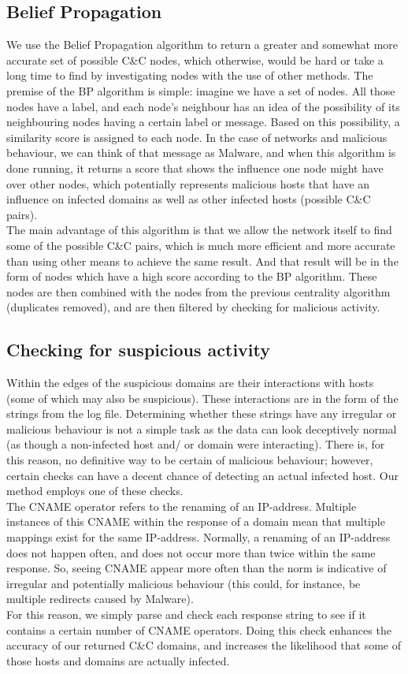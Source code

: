 \documentclass{article} %
\begin{document}
\subsection{Belief Propagation}
We use the Belief Propagation algorithm to return a greater and somewhat more accurate set of possible C\&C nodes, which otherwise, would be hard or take a long time to find by investigating nodes with the use of other methods. 
The premise of the BP algorithm is simple: imagine we have a set of nodes. All those nodes have a label, and each node's neighbour has an idea of the possibility of its neighbouring nodes having a certain label or message. Based on this 
possibility, a similarity score is assigned to each node. In the case of networks and malicious behaviour, we can think of that message as Malware, and when this algorithm is done running, it returns a score that shows the influence one 
node might have over other nodes, which potentially represents malicious hosts that have an influence on infected domains as well as other infected hosts (possible C\&C pairs). \\
The main advantage of this algorithm is that we allow the network itself to find some of the possible C\&C pairs, which is much more efficient and more accurate than using other means to achieve the same result. And that result will be in
the form of nodes which have a high score according to the BP algorithm. These nodes are then combined with the nodes from the previous centrality algorithm (duplicates removed), and are then filtered by checking for malicious activity.

\subsection{Checking for suspicious activity}
Within the edges of the suspicious domains are their interactions with hosts (some of which may also be suspicious). These interactions are in the form of the strings from the log file. Determining whether these strings have any irregular or
malicious behaviour is not a simple task as the data can look deceptively normal (as though a non-infected host and/ or domain were interacting). There is, for this reason, no definitive way to be certain of malicious behaviour; however, 
certain checks can have a decent chance of detecting an actual infected host. Our method employs one of these checks. \\
The CNAME operator refers to the renaming of an IP-address. Multiple instances of this CNAME within the response of a domain mean that multiple mappings exist for the same IP-address. Normally, a renaming of an IP-address does not happen often,
and does not occur more than twice within the same response. So, seeing CNAME appear more often than the norm is indicative of irregular and potentially malicious behaviour (this could, for instance, be multiple redirects caused by Malware). \\
For this reason, we simply parse and check each response string to see if it contains a certain number of CNAME operators.
Doing this check enhances the accuracy of our returned C\&C domains, and increases the likelihood that some of those hosts and domains are actually infected. 
\end{document}
